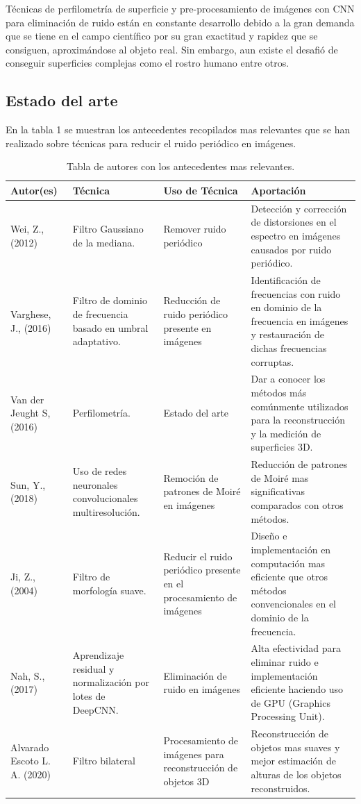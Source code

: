 \documentclass[10pt,letterpaper]{article}
\begin{document}
Técnicas de perfilometría de superficie y pre-procesamiento de imágenes con CNN para eliminación de ruido están en constante desarrollo debido a la gran demanda que se tiene en el campo científico por su gran exactitud y rapidez que se consiguen, aproximándose al objeto real. Sin embargo, aun existe el desafió de conseguir superficies complejas como el rostro humano entre otros.


\subsection{Estado del arte}
En la tabla 1 se muestran los antecedentes recopilados mas relevantes que se han realizado sobre técnicas para reducir el ruido periódico en imágenes.

\begin{table}[H]
\centering
\caption{Tabla de autores con los antecedentes mas relevantes.}
\begin{turn}{90}
\begin{tabular}{ p{3.5cm} p{3.5cm} p{3.5cm} p{6cm}}
\hline
Autor(es)& Técnica & Uso de Técnica & Aportación \\
\hline \hline
Wei, Z., (2012) & Filtro Gaussiano de la mediana. & Remover ruido periódico & Detección y corrección de distorsiones en el espectro en imágenes  causados por ruido periódico. \\
\hline
Varghese, J., (2016) & Filtro de dominio de frecuencia basado en umbral adaptativo. & Reducción de ruido periódico presente en imágenes & Identificación de frecuencias con ruido en dominio de la frecuencia en imágenes y restauración de dichas frecuencias corruptas.   \\
\hline
Van der Jeught S, (2016) & Perfilometría. & Estado del arte & Dar a conocer los métodos más comúnmente utilizados para la reconstrucción y la medición de superficies 3D.\\
\hline
Sun, Y., (2018) & Uso de redes neuronales convolucionales multiresolución. & Remoción de patrones de Moiré en imágenes & Reducción de patrones de Moiré mas significativas comparados con otros métodos. \\
\hline
Ji, Z., (2004) & Filtro de morfología suave. & Reducir el ruido periódico presente en el procesamiento de imágenes & Diseño e implementación en computación mas eficiente que otros métodos convencionales en el dominio de la frecuencia. \\
\hline
Nah, S., (2017) & Aprendizaje residual y normalización por lotes de DeepCNN. & Eliminación de ruido en imágenes & Alta efectividad para eliminar ruido e implementación eficiente haciendo uso de GPU (Graphics Processing Unit). \\
\hline
Alvarado Escoto L. A. (2020) & Filtro bilateral & Procesamiento de imágenes para reconstrucción de objetos 3D & Reconstrucción de objetos mas suaves y mejor estimación de alturas de los objetos reconstruidos. \\

\hline
\end{tabular}%
\label{tabla:autores}
\end{turn}
\end{table}
\end{document}
